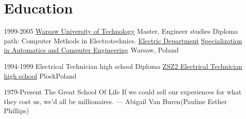 

\section{Education}
\cventry
    {1999-2005}
    {\href{http://www.pw.edu.pl}
        {Warsaw University of Technology}}
    {{Master, Engineer studies}
        {Diploma path: Computer Methods in Electrotechnics.}}
    {\href{http://www.ee.pw.edu.pl}
        {Electric Department}}
    {\href{http://www.iem.pw.edu.pl}
        {Specialization in Automatics and Computer Engineering}}
    {Warsaw, Poland}

\cventry
    {1994-1999}
    {Electrical Technician high school Diploma}
    {\href{http://www.zsznr2.pl/}
        {ZSZ2 Electrical Technician high school}}
    {Plock}{Poland}{}

\cventry
    {1979-Present}
    {The Great School Of Life}
    {}{}
    {If we could sell our experiences for what they cost us, we'd all be
    millionaires. --- Abigail Van Buren(Pauline Esther Phillips)}
    {
    }
